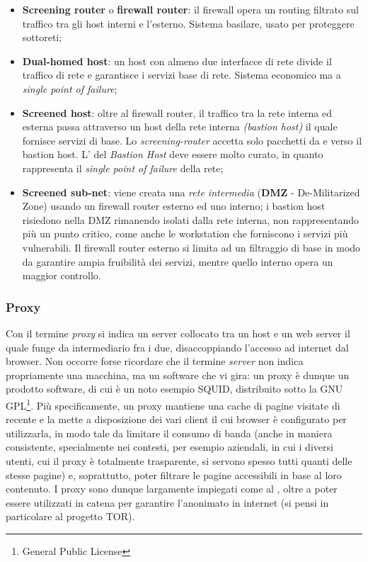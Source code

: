 \documentclass[a4paper, twoside]{article}
\def\subsub#1{\subsubsection{#1}\label{#1}}
\def\vedi#1{\nameref{#1}}
\begin{document}
\begin{itemize}
\item \textbf{Screening router} o \textbf{firewall router}: il firewall opera un routing filtrato sul traffico tra gli host interni e l'esterno. Sistema basilare, usato per proteggere sottoreti;
\item \textbf{Dual-homed host}: un host con almeno due interfacce di rete divide il traffico di rete e garantisce i servizi base di rete. Sistema economico ma a \textit{single point of failure};
\item \textbf{Screened host}: oltre al firewall router, il traffico tra la rete interna ed esterna passa attraverso un host della rete interna \textit{(bastion host)} il quale fornisce servizi di base. Lo \textit{screening-router} accetta solo pacchetti da e verso il bastion host. L'\vedi{Hardening} del \textit{Bastion Host} deve essere molto curato, in quanto rappresenta il \textit{single point of failure} della rete;
\item \textbf{Screened sub-net}: viene creata una \textit{rete intermedia} (\textbf{DMZ} - De-Militarized Zone) usando un firewall router esterno ed uno interno; i bastion host risiedono nella DMZ rimanendo isolati dalla rete interna, non rappresentando più un punto critico, come anche le workstation che forniscono i servizi più vulnerabili. Il firewall router esterno si limita ad un filtraggio di base in modo da garantire ampia fruibilità dei servizi, mentre quello interno opera un maggior controllo.
\end{itemize}
\subsub{Proxy}
Con il termine \textit{proxy} si indica un server collocato tra un host e un web server il quale funge da intermediario fra i due, disaccoppiando l'accesso ad internet dal browser. Non occorre forse ricordare che il termine \textit{server} non indica propriamente una macchina, ma un software che vi gira: un proxy è dunque un prodotto software, di cui è un noto esempio SQUID, distribuito sotto la GNU GPL\footnote{General Public License}. Più specificamente, un proxy mantiene una cache di pagine visitate di recente e la mette a disposizione dei vari client il cui browser è configurato per utilizzarla, in modo tale da limitare il consumo di banda (anche in maniera consistente, specialmente nei contesti, per esempio aziendali, in cui i diversi utenti, cui il proxy è totalmente trasparente, si servono spesso tutti quanti delle stesse pagine) e, soprattutto, poter filtrare le pagine accessibili in base al loro contenuto. I proxy sono dunque largamente impiegati come \vedi{Firewall} al \vedi{Livello delle applicazioni}, oltre a poter essere utilizzati in catena per garantire l'anonimato in internet (si pensi in particolare al progetto TOR).
\end{document}
